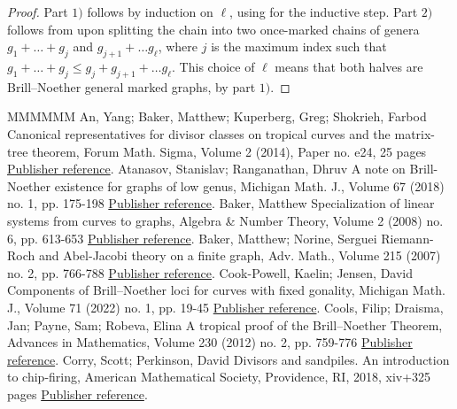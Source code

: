 \documentclass[11pt]{article}
\theoremstyle{definition}
\numberwithin{equation}{section}
\begin{document}
\begin{proof}
Part $1)$ follows by induction on $\ell$, using  for the inductive step. Part $2)$ follows from  upon splitting the chain into two once-marked chains of genera $g_1 + \ldots + g_j$ and $g_{j+1} + \ldots g_\ell$, where $j$ is the maximum index such that $g_1 + \ldots + g_j \leq g_{j} + g_{j+1} + \ldots g_\ell$.  This choice of $\ell$ means that both halves are Brill--Noether general marked graphs, by part $1)$.
\end{proof}
\begin{thebibliography}{MMMMMM}
 An, Yang; Baker, Matthew; Kuperberg, Greg; Shokrieh, Farbod Canonical representatives for divisor classes on tropical curves and the matrix-tree theorem, Forum Math. Sigma, Volume 2 (2014), Paper no. e24, 25 pages \href{https://alco.centre-mersenne.org/articles/10.5802/alco.443/#ABKS}{Publisher reference}.
 Atanasov, Stanislav; Ranganathan, Dhruv A note on Brill-Noether existence for graphs of low genus, Michigan Math. J., Volume 67 (2018) no. 1, pp. 175-198 \href{https://alco.centre-mersenne.org/articles/10.5802/alco.443/#atanasovRanganathan}{Publisher reference}.
 Baker, Matthew Specialization of linear systems from curves to graphs, Algebra \& Number Theory, Volume 2 (2008) no. 6, pp. 613-653 \href{https://alco.centre-mersenne.org/articles/10.5802/alco.443/#BakerSpec}{Publisher reference}.
 Baker, Matthew; Norine, Serguei Riemann-Roch and Abel-Jacobi theory on a finite graph, Adv. Math., Volume 215 (2007) no. 2, pp. 766-788 \href{https://alco.centre-mersenne.org/articles/10.5802/alco.443/#BakNor07}{Publisher reference}.
 Cook-Powell, Kaelin; Jensen, David Components of Brill–Noether loci for curves with fixed gonality, Michigan Math. J., Volume 71 (2022) no. 1, pp. 19-45 \href{https://alco.centre-mersenne.org/articles/10.5802/alco.443/#CookPowellJensen}{Publisher reference}.
 Cools, Filip; Draisma, Jan; Payne, Sam; Robeva, Elina A tropical proof of the Brill–Noether Theorem, Advances in Mathematics, Volume 230 (2012) no. 2, pp. 759-776 \href{https://alco.centre-mersenne.org/articles/10.5802/alco.443/#CDPR12}{Publisher reference}.
 Corry, Scott; Perkinson, David Divisors and sandpiles. An introduction to chip-firing, American Mathematical Society, Providence, RI, 2018, xiv+325 pages \href{https://alco.centre-mersenne.org/articles/10.5802/alco.443/#corry2018divisors}{Publisher reference}.

\end{thebibliography}
\end{document}
